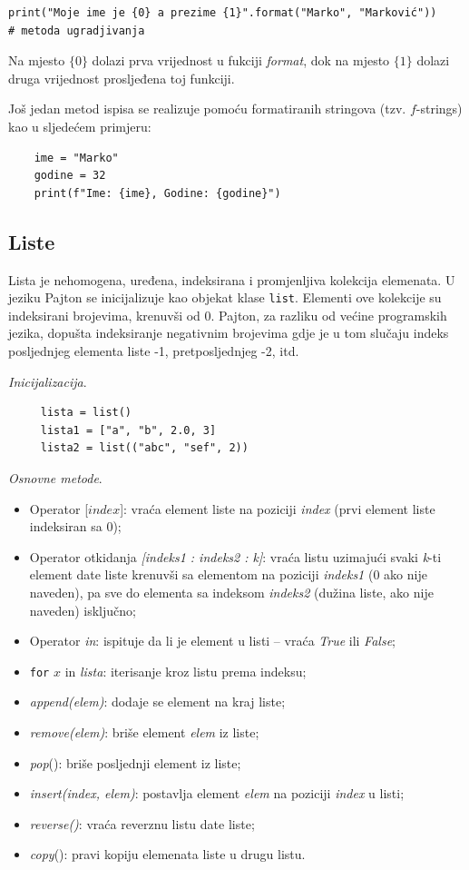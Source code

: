 \begin{verbatim}
print("Moje ime je {0} a prezime {1}".format("Marko", "Marković")) 
# metoda ugradjivanja
\end{verbatim}
Na mjesto $\{0\}$ dolazi prva vrijednost u fukciji \textit{format}, dok na mjesto $\{1\}$ dolazi druga  vrijednost prosljeđena toj funkciji.  

Još jedan metod ispisa se realizuje pomoću formatiranih stringova (tzv. $f$-strings) kao u sljedećem primjeru:
\begin{verbatim}
	ime = "Marko"
	godine = 32
	print(f"Ime: {ime}, Godine: {godine}")
\end{verbatim}

\subsection{Liste}
Lista je nehomogena, uređena, indeksirana i promjenljiva kolekcija elemenata. U jeziku Pajton se inicijalizuje kao objekat klase \texttt{list}. Elementi ove kolekcije su indeksirani brojevima, krenuvši od 0. Pajton, za razliku od većine programskih jezika, dopušta indeksiranje negativnim brojevima gdje je u tom slučaju indeks posljednjeg elementa liste -1, pretposljednjeg -2, itd.  

\textit{Inicijalizacija}.

\begin{verbatim}
	 lista = list()
	 lista1 = ["a", "b", 2.0, 3]
	 lista2 = list(("abc", "sef", 2))
\end{verbatim}

\textit{Osnovne metode}.   

\begin{itemize}
	\item Operator [$index$]: vraća element liste na poziciji \textit{index} (prvi element liste indeksiran sa 0); 
	\item Operator otkidanja \textit{[indeks1 : indeks2 : k]}: vraća listu uzimajući svaki \textit{k}-ti  element date liste  krenuvši sa elementom na poziciji \textit{indeks1} (0 ako nije naveden),  pa sve do elementa sa indeksom \textit{indeks2} (dužina liste, ako nije naveden) isključno; 
	\item Operator \textit{in}: ispituje da li je element u listi -- vraća \emph{True} ili \emph{False};
	\item \texttt{for} $x$ in \emph{lista}: iterisanje kroz listu prema indeksu; 
	\item \textit{append(elem)}: dodaje se element na kraj liste;
	\item  \textit{remove(elem)}: briše element \textit{elem} iz liste;
	\item  \textit{pop}(): briše posljednji element iz liste;
	\item  \textit{insert(index, elem)}: postavlja element \textit{elem} na poziciji \textit{index} u listi;
	\item  \textit{reverse()}: vraća reverznu  listu date liste; 
	\item \textit{copy}(): pravi kopiju elemenata liste u drugu listu. 
 \end{itemize}

